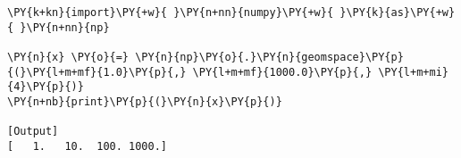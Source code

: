 \begin{Verbatim}[label=\makebox{\href{https://github.com/unipi-physics-labs/lab1-notes/tree/main/snippy/np.geomspace.py}{https://github.com/.../np.geomspace.py}},commandchars=\\\{\}]
\PY{k+kn}{import}\PY{+w}{ }\PY{n+nn}{numpy}\PY{+w}{ }\PY{k}{as}\PY{+w}{ }\PY{n+nn}{np}

\PY{n}{x} \PY{o}{=} \PY{n}{np}\PY{o}{.}\PY{n}{geomspace}\PY{p}{(}\PY{l+m+mf}{1.0}\PY{p}{,} \PY{l+m+mf}{1000.0}\PY{p}{,} \PY{l+m+mi}{4}\PY{p}{)}
\PY{n+nb}{print}\PY{p}{(}\PY{n}{x}\PY{p}{)}

[Output]
[   1.   10.  100. 1000.]
\end{Verbatim}
